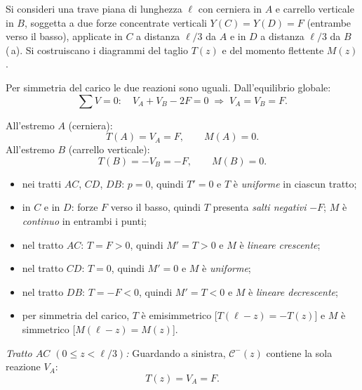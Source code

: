 \begin{esempio}
	Si consideri una trave piana di lunghezza $\ell$
	con cerniera in $A$ e carrello verticale in $B$,
	soggetta a due forze concentrate verticali
	$Y(C) = Y(D) = F$ (entrambe verso il basso),
	applicate in $C$ a distanza $\ell/3$ da $A$
	e in $D$ a distanza $\ell/3$ da $B$ (\,a).
	Si costruiscano i diagrammi del taglio $T(z)$
	e del momento flettente $M(z)$.
	
	\begin{svolgimento}
		
		



		
		
		Per simmetria del carico le due reazioni sono
		uguali. Dall'equilibrio globale:
		\[
		\sum V = 0:\quad
		V_A + V_B - 2F = 0
		\;\Rightarrow\;
		V_A = V_B = F.
		\]
		
		All'estremo $A$ (cerniera):
		\[
		T(A) = V_A = F, \qquad M(A) = 0.
		\]
		All'estremo $B$ (carrello verticale):
		\[
		T(B) = -V_B = -F, \qquad M(B) = 0.
		\]
		
		\begin{itemize}[nosep]
			\item nei tratti $AC$, $CD$, $DB$: $p = 0$,
			quindi $T' = 0$ e $T$ è \emph{uniforme}
			in ciascun tratto;
			\item in $C$ e in $D$: forze $F$ verso il
			basso, quindi $T$ presenta
			\emph{salti negativi} $-F$; $M$ è
			\emph{continuo} in entrambi i punti;
			\item nel tratto $AC$: $T = F > 0$, quindi
			$M' = T > 0$ e $M$ è \emph{lineare
				crescente};
			\item nel tratto $CD$: $T = 0$, quindi
			$M' = 0$ e $M$ è \emph{uniforme};
			\item nel tratto $DB$: $T = -F < 0$, quindi
			$M' = T < 0$ e $M$ è \emph{lineare
				decrescente};
			\item per simmetria del carico, $T$ è
			emisimmetrico [$T(\ell-z) = -T(z)$]
			e $M$ è simmetrico [$M(\ell-z) = M(z)$].
		\end{itemize}
		
		
		\textit{Tratto $AC$ $(0 \leq z < \ell/3)$:}
		Guardando a sinistra, $\mathcal{C}^-(z)$
		contiene la sola reazione $V_A$:
		\[
		T(z) = V_A = F.
		\]
		

\end{svolgimento}
\end{esempio}
